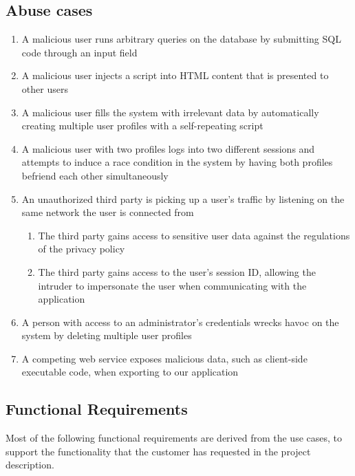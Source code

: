 \documentclass[a4paper]{article}
\begin{document}
\subsection{Abuse cases}
\begin{enumerate}
\item A malicious user runs arbitrary queries on the database by submitting SQL code through an input field
\item A malicious user injects a script into HTML content that is presented to other users
\item A malicious user fills the system with irrelevant data by automatically creating multiple user profiles with a self-repeating script
\item A malicious user with two profiles logs into two different sessions and attempts to induce a race condition in the system by having both profiles befriend each other simultaneously
\item An unauthorized third party is picking up a user's traffic by listening on the same network the user is connected from
	\begin{enumerate}
		\item The third party gains access to sensitive user data against the regulations of the privacy policy
		\item The third party gains access to the user's session ID, allowing the intruder to impersonate the user when communicating with the application
	\end{enumerate}
\item A person with access to an administrator's credentials wrecks havoc on the system by deleting multiple user profiles
\item A competing web service exposes malicious data, such as client-side executable code, when exporting to our application
\end{enumerate}

\subsection{Functional Requirements}
Most of the following functional requirements are derived from the use cases, to support the functionality that the customer has requested in the project description. 
\end{document}
